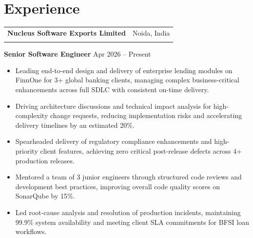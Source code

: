 \documentclass[a4paper,10pt]{article}
\makeatletter
\newcommand{\resumeSubheading}[4]{
\vspace{2pt}
\begin{tabular*}{\textwidth}{l@{\extracolsep{\fill}}r}
\textbf{#1} & #2 \\
\textit{#3} & \textit{#4} \\
\end{tabular*}\vspace{4pt}
}
\makeatother
\begin{document}
\vspace{-18pt}
\section*{Experience}
\vspace{-5pt}
\resumeSubheading
{Nucleus Software Exports Limited}{Noida, India}
{}{ }

\vspace{-18pt}

\textbf{Senior Software Engineer} \hfill Apr 2026 -- Present
\begin{itemize}[leftmargin=*]
\vspace{-4pt}
\item Leading end-to-end design and delivery of enterprise lending modules on FinnOne for 3+ global banking clients, managing complex business-critical enhancements across full SDLC with consistent on-time delivery.
\vspace{-5pt}
\item Driving architecture discussions and technical impact analysis for high-complexity change requests, reducing implementation risks and accelerating delivery timelines by an estimated 20\%.
\vspace{-5pt}
\item Spearheaded delivery of regulatory compliance enhancements and high-priority client features, achieving zero critical post-release defects across 4+ production releases.
\vspace{-5pt}
\item Mentored a team of 3 junior engineers through structured code reviews and development best practices, improving overall code quality scores on SonarQube by 15\%.
\vspace{-5pt}
\item Led root-cause analysis and resolution of production incidents, maintaining 99.9\% system availability and meeting client SLA commitments for BFSI loan workflows.
\end{itemize}

\vspace{-3pt}
\end{document}
